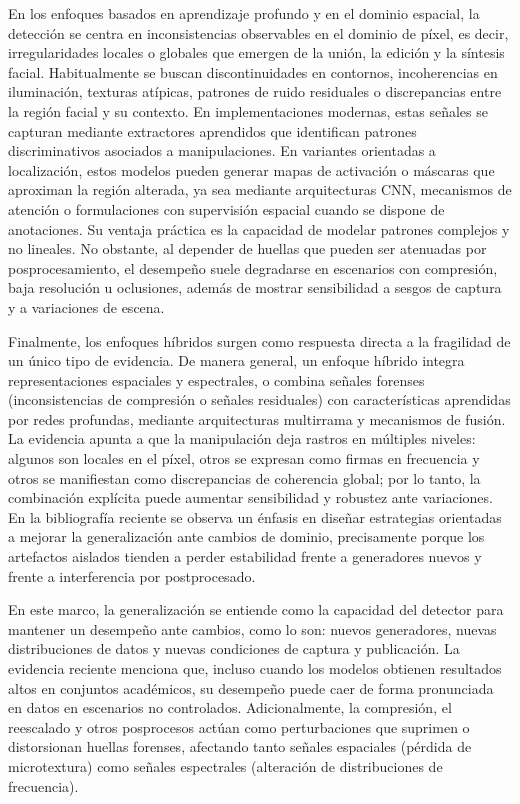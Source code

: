 En los enfoques basados en aprendizaje profundo y en el dominio espacial, la detección se centra en inconsistencias observables en el dominio de píxel, es decir, irregularidades locales o globales que emergen de la unión, la edición y la síntesis facial. Habitualmente se buscan discontinuidades en contornos, incoherencias en iluminación, texturas atípicas, patrones de ruido residuales o discrepancias entre la región facial y su contexto. En implementaciones modernas, estas señales se capturan mediante extractores aprendidos que identifican patrones discriminativos asociados a manipulaciones. En variantes orientadas a localización, estos modelos pueden generar mapas de activación o máscaras que aproximan la región alterada, ya sea mediante arquitecturas CNN, mecanismos de atención o formulaciones con supervisión espacial cuando se dispone de anotaciones. Su ventaja práctica es la capacidad de modelar patrones complejos y no lineales. No obstante, al depender de huellas que pueden ser atenuadas por posprocesamiento, el desempeño suele degradarse en escenarios con compresión, baja resolución u oclusiones, además de mostrar sensibilidad a sesgos de captura y a variaciones de escena. \parencite{Banerjee2025, Alrashoud2025}


Finalmente, los enfoques híbridos surgen como respuesta directa a la fragilidad de un único tipo de evidencia. De manera general, un enfoque híbrido integra representaciones espaciales y espectrales, o combina señales forenses (inconsistencias de compresión o señales residuales) con características aprendidas por redes profundas, mediante arquitecturas multirrama y mecanismos de fusión. La evidencia apunta a que la manipulación deja rastros en múltiples niveles: algunos son locales en el píxel, otros se expresan como firmas en frecuencia y otros se manifiestan como discrepancias de coherencia global; por lo tanto, la combinación explícita puede aumentar sensibilidad y robustez ante variaciones. En la bibliografía reciente se observa un énfasis en diseñar estrategias orientadas a mejorar la generalización ante cambios de dominio, precisamente porque los artefactos aislados tienden a perder estabilidad frente a generadores nuevos y frente a interferencia por postprocesado. \parencite{Li2025, Qiao2025}
 
En este marco, la generalización se entiende como la capacidad del detector para mantener un desempeño ante cambios, como lo son: nuevos generadores, nuevas distribuciones de datos y nuevas condiciones de captura y publicación. La evidencia reciente menciona que, incluso cuando los modelos obtienen resultados altos en conjuntos académicos, su desempeño puede caer de forma pronunciada en datos en escenarios no controlados. Adicionalmente, la compresión, el reescalado y otros posprocesos actúan como perturbaciones que suprimen o distorsionan huellas forenses, afectando tanto señales espaciales (pérdida de microtextura) como señales espectrales (alteración de distribuciones de frecuencia). \parencite{Hu2024, Li2025, Chandra2025}

